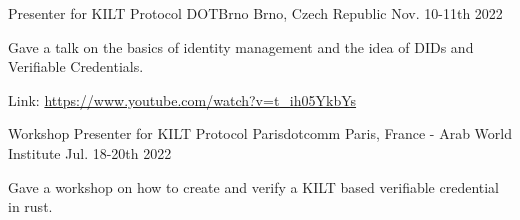 


\begin{cventries}


\cventry
{Presenter for KILT Protocol} %
{DOTBrno} %
{Brno, Czech Republic} %
{Nov. 10-11th 2022} %
{ %
\begin{cvitems}
\item {Gave a talk on the basics of identity management and the idea of DIDs and Verifiable Credentials.}
\item {Link: \url{https://www.youtube.com/watch?v=t_ih05YkbYs}}
\end{cvitems}
}

\cventry
{Workshop Presenter for KILT Protocol} %
{Parisdotcomm} %
{Paris, France - Arab World Institute} %
{Jul. 18-20th 2022} %
{ %
\begin{cvitems}
\item {Gave a workshop on how to create and verify a KILT based verifiable credential in rust.}
\end{cvitems}
}



\end{cventries}